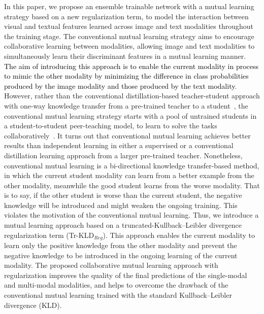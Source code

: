 \documentclass[twocolumn]{svjour3}
\begin{document}
In this paper, we propose an ensemble trainable network with a mutual learning strategy based on a new regularization term, to model the interaction between visual and textual features learned across image and text modalities throughout the training stage. The conventional mutual learning strategy aims to encourage collaborative learning between modalities, allowing image and text modalities to simultaneously learn their discriminant features in a mutual learning manner. \textcolor{black}{The aim of introducing this approach is to enable the current modality in process to mimic the other modality by minimizing the difference in class probabilities produced by the image modality and those produced by the text modality}. However, rather than the conventional distillation-based teacher-student approach with one-way knowledge transfer from a pre-trained teacher to a student~\cite{hinton2015distilling}, the conventional mutual learning strategy starts with a pool of untrained students in a student-to-student peer-teaching model, to learn to solve the tasks collaboratively~\cite{zhang2018deep}. It turns out that conventional mutual learning achieves better results than independent learning in either a supervised or a conventional distillation learning approach from a larger pre-trained teacher. Nonetheless, conventional mutual learning is a bi-directional knowledge transfer-based method, in which the current student modality can learn from a better example from the other modality, meanwhile the good student learns from the worse modality. That is to say, if the other student is worse than the current student, the negative knowledge will be introduced and might weaken the ongoing training. This violates the motivation of the conventional mutual learning.
Thus, we introduce a mutual learning approach based on a truncated-Kullback–Leibler divergence regularization term (Tr-KLD$_{Reg}$). This approach enables the current modality to learn only the positive knowledge from the other modality and prevent the negative knowledge to be introduced in the ongoing learning of the current modality. The proposed collaborative mutual learning approach with regularization improves the quality of the final predictions of the single-modal and multi-modal modalities, and helps to overcome the drawback of the conventional mutual learning trained with the standard Kullback–Leibler divergence (KLD).
\end{document}
